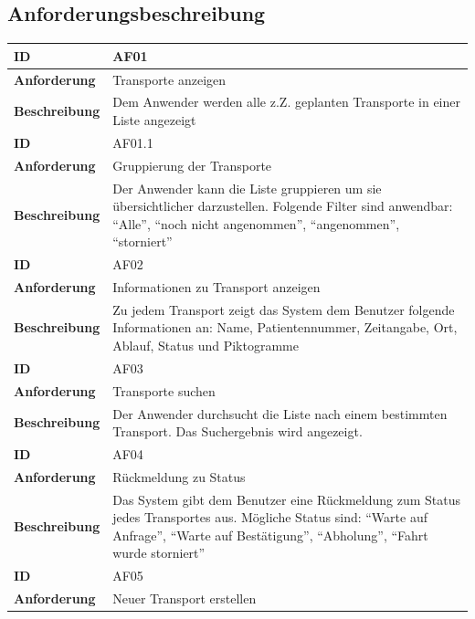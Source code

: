 \documentclass[a4paper, ngerman, 12pt]{scrartcl}
\begin{document}
\subsection{Anforderungsbeschreibung}
\begin{tabular}{|l|p{10cm}|}
\hline
\cellcolor{lightgray}\textbf{ID}&AF01\\
\hline
\cellcolor{lightgray}\textbf{Anforderung}&Transporte anzeigen\\
\hline
\cellcolor{lightgray}\textbf{Beschreibung}&Dem Anwender werden alle z.Z. geplanten Transporte in einer Liste angezeigt\\
\hline
\hline
\cellcolor{lightgray}\textbf{ID}&AF01.1\\
\hline
\cellcolor{lightgray}\textbf{Anforderung}&Gruppierung der Transporte\\
\hline
\cellcolor{lightgray}\textbf{Beschreibung}&Der Anwender kann die Liste gruppieren um sie übersichtlicher darzustellen. Folgende Filter sind anwendbar: ``Alle'', ``noch nicht angenommen'', ``angenommen'', ``storniert''\\
\hline
\hline
\cellcolor{lightgray}\textbf{ID}&AF02\\
\hline
\cellcolor{lightgray}\textbf{Anforderung}&Informationen zu Transport anzeigen\\
\hline
\cellcolor{lightgray}\textbf{Beschreibung}&Zu jedem Transport zeigt das System dem Benutzer folgende Informationen an: Name, Patientennummer, Zeitangabe, Ort, Ablauf, Status und Piktogramme\\
\hline
\hline
\cellcolor{lightgray}\textbf{ID}&AF03\\
\hline
\cellcolor{lightgray}\textbf{Anforderung}&Transporte suchen\\
\hline
\cellcolor{lightgray}\textbf{Beschreibung}&Der Anwender durchsucht die Liste nach einem bestimmten Transport. Das Suchergebnis wird angezeigt.\\
\hline
\hline
\cellcolor{lightgray}\textbf{ID}&AF04\\
\hline
\cellcolor{lightgray}\textbf{Anforderung}&Rückmeldung zu Status\\
\hline
\cellcolor{lightgray}\textbf{Beschreibung}&Das System gibt dem Benutzer eine Rückmeldung zum Status jedes Transportes aus. Mögliche Status sind: ``Warte auf Anfrage'', ``Warte auf Bestätigung'', ``Abholung'', ``Fahrt wurde storniert''\\
\hline
\hline
\cellcolor{lightgray}\textbf{ID}&AF05\\
\hline
\cellcolor{lightgray}\textbf{Anforderung}&Neuer Transport erstellen\\

\end{tabular}
\end{document}
